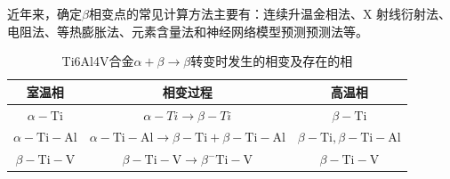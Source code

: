 \documentclass[
class = book,
zihao = -4,
font = noto,
paper = a4paper,
openany
]{easybook}
\newcommand{\ti}{Ti6Al4V}
\begin{document}
近年来，确定$ \beta $相变点的常见计算方法\cite{zhuhongTaihejinaVxiangbiandiandejizhongceshifangfatantao2013}主要有：连续升温金相法、X 射线衍射法、电阻法、等热膨胀法、元素含量法和神经网络模型预测预测法\cite{renchiqiangGurongshixiaoduiTC4taihejinxianweizuzhihelixuexingnengdeyingxiang2022}等。
\begin{table}[htbp]
	\centering
	\caption{\ti 合金$ \alpha+\beta \to \beta $转变时发生的相变及存在的相}
	\label{sec:Tc4betachange}
\begin{tabular}{ccc}
	\toprule 室温相 & 相变过程 & 高温相 \\
	\midrule$\alpha-\mathrm{Ti}$ & $\alpha-T i \rightarrow \beta-T i$ & $\beta-\mathrm{Ti}$ \\
	$\alpha-\mathrm{Ti}-\mathrm{Al}$ & $\alpha-\mathrm{Ti}-\mathrm{Al} \rightarrow \beta-\mathrm{Ti}+\beta-\mathrm{Ti}-\mathrm{Al}$ & $\beta-\mathrm{Ti}, \beta-\mathrm{Ti}-\mathrm{Al}$ \\
	$\beta- \mathrm{Ti}-\mathrm{V}$ & $\beta-\mathrm{Ti}-\mathrm{V} \rightarrow \beta^{-} \mathrm{Ti}-\mathrm{V}$ & $\beta-\mathrm{Ti}-\mathrm{V}$ \\
	\bottomrule
\end{tabular}
\end{table}
\end{document}
